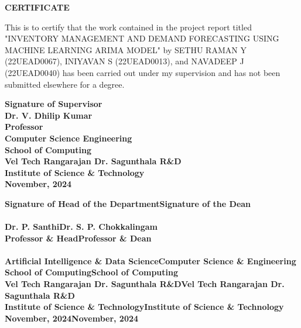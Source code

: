 \documentclass[10pt]{report}
\begin{document}
\begin{center}
\newpage
{}
\begin{center}
{\Huge \textbf{CERTIFICATE}}\\[1cm]
\end{center}
\linespread{1.5}
\justifying
\large{This is to certify that the work contained in the project report titled "INVENTORY MANAGEMENT AND DEMAND FORECASTING USING MACHINE LEARNING ARIMA MODEL" by 
SETHU RAMAN Y (22UEAD0067), INIYAVAN S (22UEAD0013), and NAVADEEP J (22UEAD0040) has been carried out under my supervision and has not been submitted elsewhere for a degree.}

\vspace{1.5cm}
\begin{flushright}
\textbf{Signature of Supervisor\\Dr. V. Dhilip Kumar\\Professor\\Computer Science
Engineering\\School of Computing\\Vel Tech Rangarajan Dr. Sagunthala R\&D\\Institute of Science \&
Technology\\November, 2024}\\[2.0cm]

\end{flushright}
\begin{flushleft}
    

\textbf{Signature of Head of the Department\hfill\textbf{Signature of the Dean }\\\\\textbf{Dr. P. Santhi}\hfill\textbf{Dr. S. P. Chokkalingam}\\Professor \& Head\hfill\textbf{Professor \& Dean}\\\\Artificial Intelligence \& Data Science\hfill\textbf{Computer Science \& Engineering}\\School of Computing\hfill\textbf{School of  Computing}\\Vel Tech Rangarajan Dr. Sagunthala R\&D\hfill\textbf{Vel Tech Rangarajan Dr. Sagunthala R\&D}\\Institute of
Science \& Technology\hfill\textbf{Institute of
Science \& Technology}\\November, 2024\hfill\textbf{November, 2024}\\\hfill\textbf{}\\}\hfill\textbf{}\\\
\end{flushleft}





\end{center}
\end{document}
